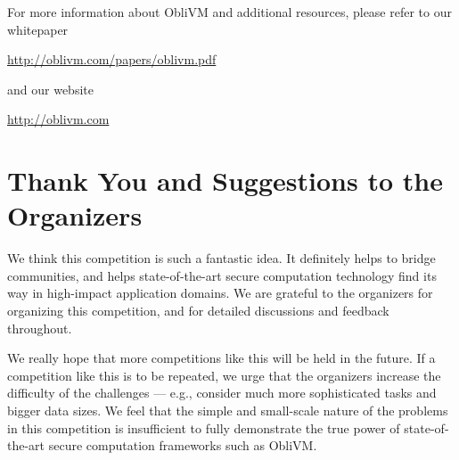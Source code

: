 \documentclass[11pt]{article}
\begin{document}
\vspace{10pt}
For more information about {\sf ObliVM} and additional resources,
please refer to our whitepaper  

\begin{center}
\url{http://oblivm.com/papers/oblivm.pdf}
\end{center}

and our website 

\begin{center}
\url{http://oblivm.com}
\end{center}


\section{Thank You and Suggestions to the Organizers}
We think this competition is such a fantastic idea. 
It definitely helps to bridge communities, and helps 
state-of-the-art secure computation technology  
find its way in high-impact application domains.
We are grateful to the organizers for organizing this competition,
and for detailed discussions and feedback 
throughout.

We really hope that more competitions like this will be held in the future.
If a competition like this is to be repeated, we 
urge that the organizers increase the difficulty 
of the challenges --- e.g., consider much more sophisticated tasks
and bigger data sizes. 
We feel that the simple and small-scale nature of the problems  
in this competition is insufficient to fully demonstrate the true power
of state-of-the-art secure computation frameworks such as {\sf ObliVM}.
\end{document}
